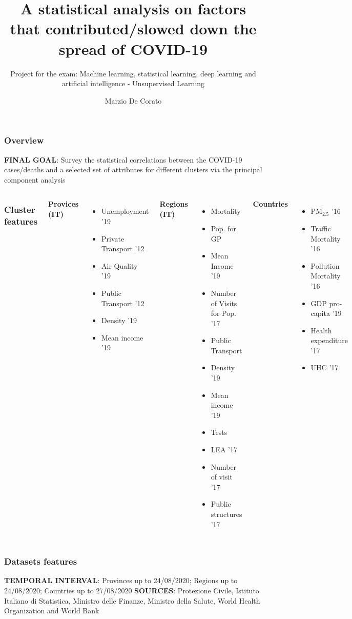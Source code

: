 \documentclass{beamer}
\title[COVID-19 - Unsupervised Learning]{A statistical analysis on factors that contributed/slowed down the spread of COVID-19}
\author{Marzio De Corato}
\subtitle{Project for the exam: Machine learning, statistical
learning, deep learning and artificial intelligence - Unsupervised Learning}
\begin{document}
\frame{\titlepage}

\begin{frame}
\frametitle{Overview}
\textbf{FINAL GOAL}: Survey the statistical correlations between the COVID-19 cases/deaths and a selected set of attributes for different clusters via the principal component analysis

\end{frame}

\begin{frame}

\begin{columns}
\frametitle{Cluster features}
\textbf{Provices (IT)}
\begin{itemize}
\item Unemployment '19
\item Private Transport '12 
\item Air Quality '19
\item Public Transport '12
\item Density '19
\item Mean income '19
\end{itemize}
\textbf{Regions (IT)}
\begin{itemize}
\item Mortality
\item Pop. for GP
\item Mean Income '19
\item Number of Visits for Pop. '17
\item Public Transport 
\item Density '19
\item Mean income '19
\item Tests 
\item LEA '17
\item Number of visit '17
\item Public structures '17
\end{itemize}
\textbf{Countries}
\begin{itemize}
\item PM$_{2.5}$ '16
\item Traffic Mortality '16
\item Pollution Mortality '16
\item GDP pro-capita '19
\item Health expenditure '17
\item UHC '17
\end{itemize}
\end{columns}
\end{frame}

\begin{frame}
\frametitle{Datasets features }

\textbf{TEMPORAL INTERVAL}: Provinces up to 24/08/2020; Regions up to 24/08/2020; Countries up to 27/08/2020 
\newline
\newline
\textbf{SOURCES}: Protezione Civile, Istituto Italiano di Statistica, Ministro delle Finanze, Ministro della Salute, World Health Organization and World Bank 



\end{frame}
\end{document}
